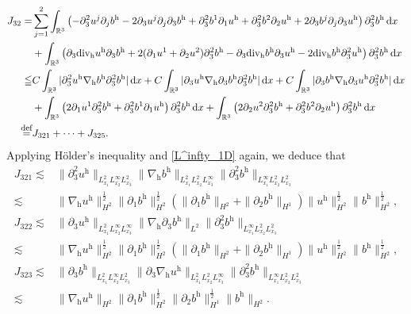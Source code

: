 \documentclass[11pt]{amsart}
\theoremstyle{definition}
\newcommand{\R}{\mathbb{R}}
\newcommand{\h}{\mathrm{h}}
\def\eqdefa{\buildrel\hbox{\footnotesize def}\over =}
\newcommand{\dx}{\,{\rm d}x}
\newcommand{\nablah}{\nabla_{\mathrm{h}}}
\numberwithin{equation}{section}
\begin{document}
\begin{align*}
	J_{32}=&\sum_{j=1}^2\int_{\R^3}\left(-\partial_{3}^2u^j\partial_jb^\h-2\partial_{3}u^j\partial_j \partial_{3}b^\h+\partial_{3}^2b^1\partial_1u^\h+\partial_{3}^2b^2\partial_2u^\h+2\partial_{3}b^j\partial_j \partial_{3}u^\h\right)\partial_{3}^2b^\h\dx\\
	&+\int_{\R^3}\left(\partial_{3}\mathrm{div_h}u^\h\partial_3b^\h+2(\partial_1u^1+\partial_2u^2)\partial_3^2b^\h-\partial_{3}\mathrm{div_h}b^\h\partial_3u^\h-2\mathrm{div_h}b^\h\partial_3^2u^\h\right)\partial_{3}^2b^\h\dx\\
	\leqq&C\int_{\R^3}|\partial_{3}^2u^\h\nablah b^\h\partial_{3}^2b^\h|\dx+C\int_{\R^3}|\partial_{3}u^\h\nablah \partial_{3}b^\h\partial_{3}^2b^\h|\dx+C\int_{\R^3}|\partial_{3}b^\h\nablah \partial_{3}u^\h\partial_{3}^2b^\h|\dx\\
	&+\int_{\R^3}\left(2\partial_1u^1\partial_3^2b^\h+\partial_{3}^2b^1\partial_1u^\h\right)\partial_{3}^2b^\h\dx+\int_{\R^3}\left(2\partial_2u^2\partial_3^2b^\h+\partial_{3}^2b^2\partial_2u^\h\right)\partial_{3}^2b^\h\dx\\
	\eqdefa& J_{321}+\cdots+J_{325}.
\end{align*}
Applying H\"older's inequality and \eqref{L^infty_1D} again, we deduce that
\begin{align*}
	J_{321}\lesssim&\| \partial_3^2u^\h \|_{L^2_{x_1}L^\infty_{x_2}L^2_{x_3}} \|\nablah b^\h\|_{L^2_{x_1}L^2_{x_2}L^\infty_{x_3}}\|\partial_{3}^2b^\h \|_{L^\infty_{x_1}L^2_{x_2}L^2_{x_3}} \\
	\lesssim& \|\nabla_\mathrm{h} u^\mathrm{h}\|_{H^2}^\frac12\|\partial_1b^\h\|_{H^2}^\frac12\left(\|\partial_1 b^\h\|_{H^2}+\|\partial_2 b^\h\|_{H^1}\right)\|u^\mathrm{h}\|_{H^2}^\frac12\| b^\h\|_{H^2}^\frac12,\\
	J_{322}\lesssim&  \| \partial_3u^\h \|_{L^2_{x_1}L^\infty_{x_2}L^\infty_{x_3}}\|\nablah\partial_{3}b^\h\|_{L^2}\|\partial_{3}^2b^\h \|_{L^\infty_{x_1}L^2_{x_2}L^2_{x_3}} \\
	\lesssim& \|\nabla_\mathrm{h} u^\mathrm{h}\|_{H^2}^\frac12\|\partial_1b^\h\|_{H^2}^\frac12\left(\|\partial_1 b^\h\|_{H^2}+\|\partial_2 b^\h\|_{H^1}\right)\|u^\mathrm{h}\|_{H^2}^\frac12\| b^\h\|_{H^2}^\frac12,\\
	J_{323}\lesssim& \| \partial_3b^\h \|_{L^2_{x_1}L^\infty_{x_2}L^2_{x_3}}\|\partial_{3}\nablah u^\h\|_{L^2_{x_1}L^2_{x_2}L^\infty_{x_3}}\|\partial_{3}^2b^\h \|_{L^\infty_{x_1}L^2_{x_2}L^2_{x_3}} \\
	\lesssim& \|\nablah u^\h\|_{H^2}\|\partial_1 b^\h\|_{H^2}^\frac12\|\partial_2 b^\h\|_{H^1}^\frac12\| b^\h\|_{H^2}.
\end{align*}
\end{document}
